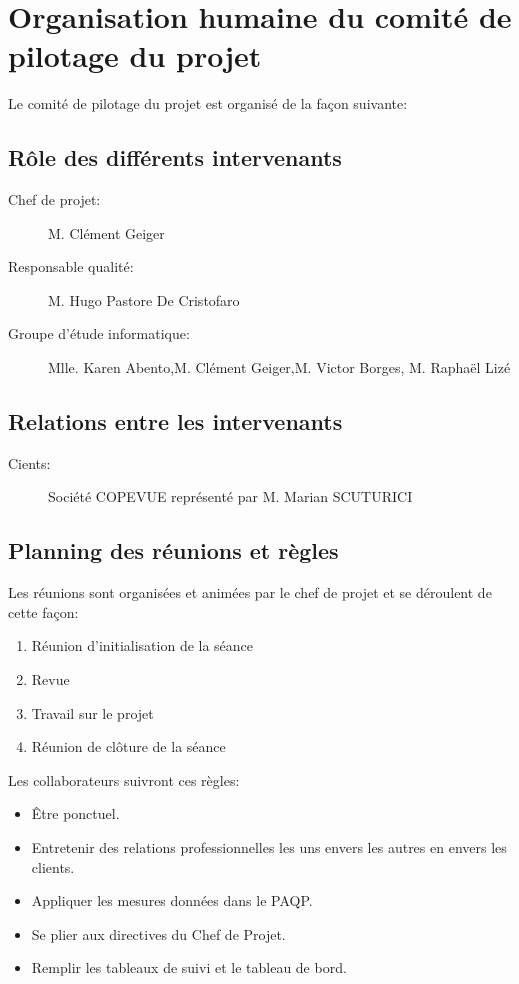 
\section{Organisation humaine du comité de pilotage du projet}

    Le comité de pilotage du projet est organisé de la façon suivante:

    \subsection{Rôle des différents intervenants}
        \begin{description}
        \item[Chef de projet:]M. Clément Geiger
        \item[Responsable qualité:]M. Hugo Pastore De Cristofaro
        \item[Groupe d'étude informatique:]Mlle. Karen Abento,M. Clément Geiger,M. 
        Victor Borges, M. Raphaël Lizé
        \end{description}

    \subsection{Relations entre les intervenants}
        \begin{description}
        \item[Cients:]Société COPEVUE représenté par M. Marian SCUTURICI
        \end{description}

    \subsection{Planning des réunions et règles}
        Les réunions sont organisées et animées par le chef de projet et se
        déroulent de cette façon:
        \begin{enumerate}
        \item Réunion d'initialisation de la séance
        \item Revue
        \item Travail sur le projet
        \item Réunion de clôture de la séance
        \end{enumerate}

        Les collaborateurs suivront ces règles:
        \begin{itemize}
        \item Être ponctuel.
        \item Entretenir des relations professionnelles les uns envers les
                autres en envers les clients.
        \item Appliquer les mesures données dans le PAQP.
        \item Se plier aux directives du Chef de Projet.
        \item Remplir les tableaux de suivi et le tableau de bord.
        \end{itemize}
